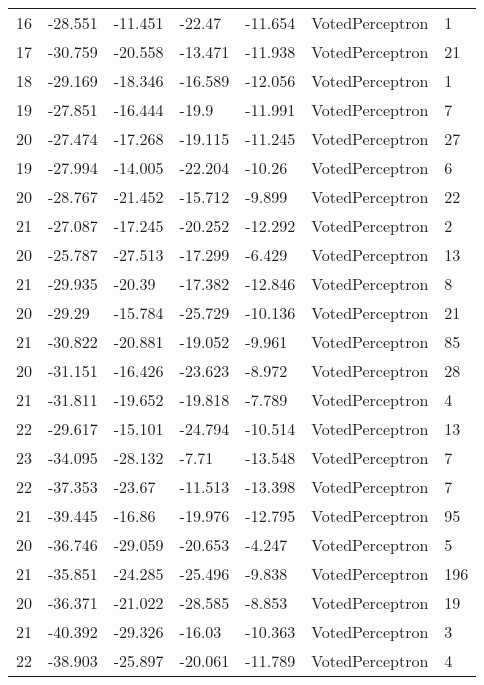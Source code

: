 \begin{tabular}{lllllll}
16 & -28.551 & -11.451 &  -22.47 & -11.654 &    VotedPerceptron &    1 \\
17 & -30.759 & -20.558 & -13.471 & -11.938 &    VotedPerceptron &   21 \\
18 & -29.169 & -18.346 & -16.589 & -12.056 &    VotedPerceptron &    1 \\
19 & -27.851 & -16.444 &   -19.9 & -11.991 &    VotedPerceptron &    7 \\
20 & -27.474 & -17.268 & -19.115 & -11.245 &    VotedPerceptron &   27 \\
19 & -27.994 & -14.005 & -22.204 &  -10.26 &    VotedPerceptron &    6 \\
20 & -28.767 & -21.452 & -15.712 &  -9.899 &    VotedPerceptron &   22 \\
21 & -27.087 & -17.245 & -20.252 & -12.292 &    VotedPerceptron &    2 \\
20 & -25.787 & -27.513 & -17.299 &  -6.429 &    VotedPerceptron &   13 \\
21 & -29.935 &  -20.39 & -17.382 & -12.846 &    VotedPerceptron &    8 \\
20 &  -29.29 & -15.784 & -25.729 & -10.136 &    VotedPerceptron &   21 \\
21 & -30.822 & -20.881 & -19.052 &  -9.961 &    VotedPerceptron &   85 \\
20 & -31.151 & -16.426 & -23.623 &  -8.972 &    VotedPerceptron &   28 \\
21 & -31.811 & -19.652 & -19.818 &  -7.789 &    VotedPerceptron &    4 \\
22 & -29.617 & -15.101 & -24.794 & -10.514 &    VotedPerceptron &   13 \\
23 & -34.095 & -28.132 &   -7.71 & -13.548 &    VotedPerceptron &    7 \\
22 & -37.353 &  -23.67 & -11.513 & -13.398 &    VotedPerceptron &    7 \\
21 & -39.445 &  -16.86 & -19.976 & -12.795 &    VotedPerceptron &   95 \\
20 & -36.746 & -29.059 & -20.653 &  -4.247 &    VotedPerceptron &    5 \\
21 & -35.851 & -24.285 & -25.496 &  -9.838 &    VotedPerceptron &  196 \\
20 & -36.371 & -21.022 & -28.585 &  -8.853 &    VotedPerceptron &   19 \\
21 & -40.392 & -29.326 &  -16.03 & -10.363 &    VotedPerceptron &    3 \\
22 & -38.903 & -25.897 & -20.061 & -11.789 &    VotedPerceptron &    4 \\

\end{tabular}
